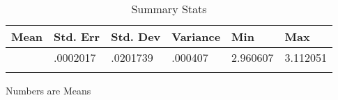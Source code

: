 \begin{table}[H] \centering
{}

\caption{Summary Stats}
\begin{tabularx}{20cm}{lCCCCC}

\toprule
{Mean}&{Std. Err}&{Std. Dev}&{Variance}&{Min}&{Max} \tabularnewline
\midrule{}&.0002017&.0201739&.000407&2.960607&3.112051 \tabularnewline
\bottomrule \addlinespace[1.5ex]

\end{tabularx}
\begin{flushleft}
\footnotesize Numbers are Means
\end{flushleft}
\end{table}
\restoregeometry
